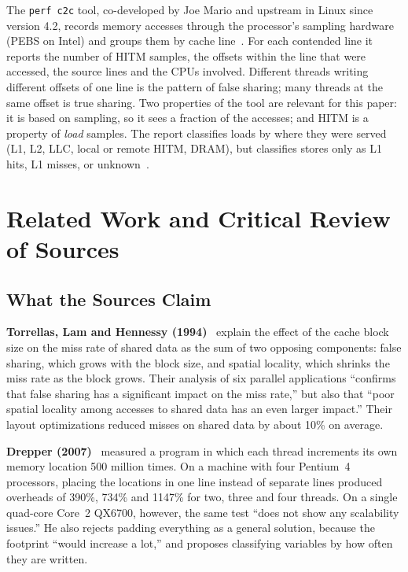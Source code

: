 \documentclass[journal]{IEEEtran}
\begin{document}
The \texttt{perf c2c} tool, co-developed by Joe Mario and upstream in Linux since
version 4.2, records memory accesses through the processor's sampling hardware
(PEBS on Intel) and groups them by cache line~\cite{mario2016c2c,perf_c2c_man}.
For each contended line it reports the number of HITM samples, the offsets
within the line that were accessed, the source lines and the CPUs involved.
Different threads writing different offsets of one line is the pattern of false
sharing; many threads at the same offset is true sharing. Two properties of the
tool are relevant for this paper: it is based on sampling, so it sees a fraction
of the accesses; and HITM is a property of \emph{load} samples. The report
classifies loads by where they were served (L1, L2, LLC, local or remote HITM,
DRAM), but classifies stores only as L1 hits, L1 misses, or
unknown~\cite{perf_c2c_man}.

\section{Related Work and Critical Review of Sources}
\label{sec:related}

\subsection{What the Sources Claim}
\textbf{Torrellas, Lam and Hennessy (1994)}~\cite{torrellas1994false} explain
the effect of the cache block size on the miss rate of shared data as the sum of
two opposing components: false sharing, which grows with the block size, and
spatial locality, which shrinks the miss rate as the block grows. Their analysis
of six parallel applications ``confirms that false sharing has a significant
impact on the miss rate,'' but also that ``poor spatial locality among accesses
to shared data has an even larger impact.'' Their layout optimizations reduced
misses on shared data by about 10\% on average.

\textbf{Drepper (2007)}~\cite{drepper2007memory} measured a program in which
each thread increments its own memory location 500 million times. On a machine
with four Pentium~4 processors, placing the locations in one line instead of
separate lines produced overheads of 390\%, 734\% and 1147\% for two, three and
four threads. On a single quad-core Core~2 QX6700, however, the same test ``does
not show any scalability issues.'' He also rejects padding everything as a
general solution, because the footprint ``would increase a lot,'' and proposes
classifying variables by how often they are written.
\end{document}
